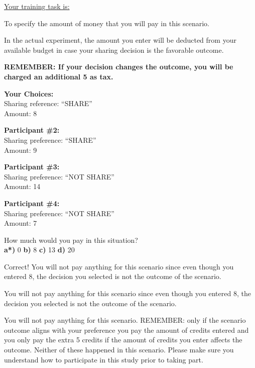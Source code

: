 
\underline{Your training task is:} 

To specify the amount of money that you will pay in this scenario. 

In the actual experiment, the amount you enter will be deducted from your available budget in case your sharing decision is the favorable outcome.

\textbf{REMEMBER:  If your decision changes the outcome, you will be charged an additional 5 as tax.}

\textbf{Your Choices:} \\
\indent \indent Sharing reference: 	``SHARE'' \\
\indent \indent Amount:		8 

\textbf{Participant \#2:} \\ 
\indent \indent Sharing preference:	``SHARE'' \\
\indent \indent Amount: 		9

\textbf{Participant \#3:} \\
\indent \indent Sharing preference:	``NOT SHARE'' \\
\indent \indent Amount: 		14

\textbf{Participant \#4:} \\
\indent \indent Sharing preference:	``NOT SHARE'' \\
\indent \indent Amount: 		7 

How much would you pay in this situation? \\
\indent \textbf{a*)} 0 \indent \indent \textbf{b)} 8
\indent \indent \textbf{c)} 13
\indent \indent \textbf{d)} 20


 Correct! You will not pay anything for this scenario since even though you entered 8, the decision you selected is not the outcome of the scenario.

 You will not pay anything for this scenario since even though you entered 8, the decision you selected is not the outcome of the scenario.

 You will not pay anything for this scenario. REMEMBER: only if the scenario outcome aligns with your preference you pay the amount of credits entered and you only pay the extra 5 credits if the amount of credits you enter affects the outcome. Neither of these happened in this scenario. Please make sure you understand how to participate in this study prior to taking part.

